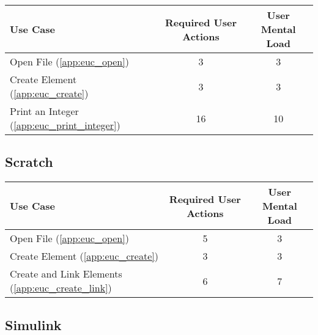 \begin{tabularx}{\textwidth}{Xcc}
\textbf{Use Case} & \textbf{Required User Actions} & \textbf{User Mental Load}\\
\hline
Open File (\ref{app:euc_open})                       & 3 & 3 \\
Create Element (\ref{app:euc_create})                & 3 & 3 \\
Print an Integer (\ref{app:euc_print_integer})       & 16 & 10
\end{tabularx}

\subsection*{Scratch}




\begin{tabularx}{\textwidth}{Xcc}
\textbf{Use Case} & \textbf{Required User Actions} & \textbf{User Mental Load}\\
\hline
Open File (\ref{app:euc_open})                       & 5 & 3 \\
Create Element (\ref{app:euc_create})                & 3 & 3 \\
Create and Link Elements (\ref{app:euc_create_link}) & 6 & 7
\end{tabularx}

\subsection*{Simulink}

